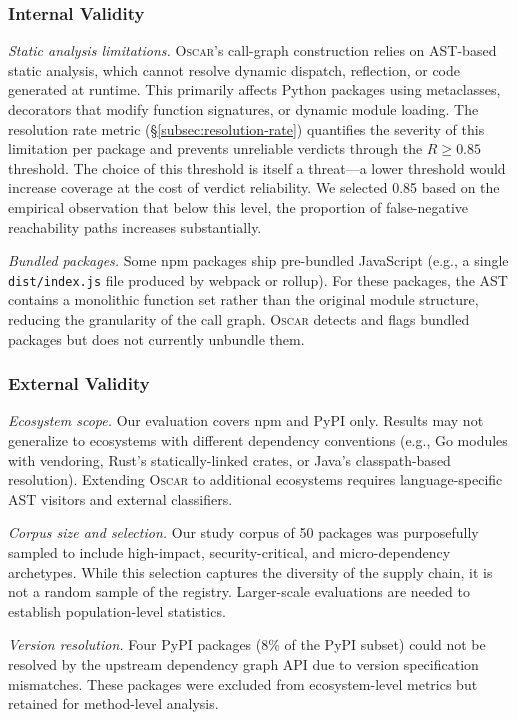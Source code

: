 \documentclass[conference]{IEEEtran}
\begin{document}
\subsubsection{Internal Validity}

\emph{Static analysis limitations.} \textsc{Oscar}'s call-graph construction relies on AST-based static analysis, which cannot resolve dynamic dispatch, reflection, or code generated at runtime. This primarily affects Python packages using metaclasses, decorators that modify function signatures, or dynamic module loading. The resolution rate metric (§\ref{subsec:resolution-rate}) quantifies the severity of this limitation per package and prevents unreliable verdicts through the $R \geq 0.85$ threshold. The choice of this threshold is itself a threat—a lower threshold would increase coverage at the cost of verdict reliability. We selected 0.85 based on the empirical observation that below this level, the proportion of false-negative reachability paths increases substantially.

\emph{Bundled packages.} Some npm packages ship pre-bundled JavaScript (e.g., a single \texttt{dist/index.js} file produced by webpack or rollup). For these packages, the AST contains a monolithic function set rather than the original module structure, reducing the granularity of the call graph. \textsc{Oscar} detects and flags bundled packages but does not currently unbundle them.

\subsubsection{External Validity}

\emph{Ecosystem scope.} Our evaluation covers npm and PyPI only. Results may not generalize to ecosystems with different dependency conventions (e.g., Go modules with vendoring, Rust's statically-linked crates, or Java's classpath-based resolution). Extending \textsc{Oscar} to additional ecosystems requires language-specific AST visitors and external classifiers.

\emph{Corpus size and selection.} Our study corpus of 50 packages was purposefully sampled to include high-impact, security-critical, and micro-dependency archetypes. While this selection captures the diversity of the supply chain, it is not a random sample of the registry. Larger-scale evaluations are needed to establish population-level statistics.

\emph{Version resolution.} Four PyPI packages (8\% of the PyPI subset) could not be resolved by the upstream dependency graph API due to version specification mismatches. These packages were excluded from ecosystem-level metrics but retained for method-level analysis.
\end{document}
